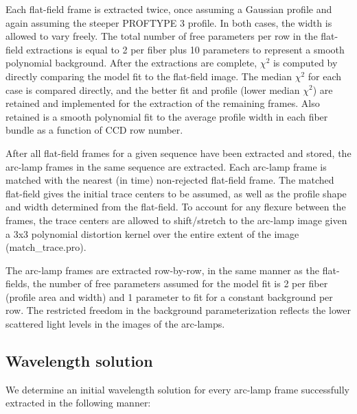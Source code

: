 \documentclass[12pt,preprint]{aastex}
\begin{document}
Each flat-field frame is extracted twice, once assuming a Gaussian
profile and again assuming the steeper PROFTYPE 3 profile.  In both cases,
the width is allowed to vary freely.  The total number of free parameters
per row in the flat-field extractions is equal to 2 per fiber plus 10
parameters to represent a smooth polynomial background.  After the extractions
are complete, $\chi^2$ is computed by directly comparing the model fit
to the flat-field image.  The median $\chi^2$ for each case is compared
directly, and the better fit and profile (lower median $\chi^2$) are retained
and implemented for the extraction of the remaining frames.  Also retained
is a smooth polynomial fit to the average profile width in each fiber bundle
as a function of CCD row number.

After all flat-field frames for a given sequence have been extracted
and stored, the arc-lamp frames in the same sequence are extracted.  
Each arc-lamp frame is matched with the nearest (in time) 
non-rejected flat-field frame.  The matched flat-field gives the 
initial trace centers to
be assumed, as well as the profile shape and width determined from the
flat-field.  To account for any flexure between the frames, the trace
centers are allowed to shift/stretch to the arc-lamp image given a 
3x3 polynomial distortion kernel over the entire extent of the image
(match\_trace.pro).

The arc-lamp frames are extracted row-by-row, in the same
manner as the flat-fields, the number of free parameters assumed
for the model fit is 2 per fiber (profile area and width) and 1 parameter
to fit for a constant background per row.  The restricted freedom in the
background parameterization reflects the lower scattered light levels in
the images of the arc-lamps.

\subsection{Wavelength solution}

We determine an initial wavelength solution for every arc-lamp frame
successfully extracted in the following manner:
\end{document}
